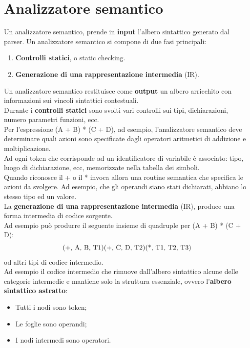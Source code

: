 \documentclass[12pt]{report}
\begin{document}
	\section{Analizzatore semantico}
	Un analizzatore semantico, prende in \textbf{input} l'albero sintattico generato dal parser. Un analizzatore semantico si compone di due fasi principali:
	\begin{enumerate}
		\item \textbf{Controlli statici}, o static checking.
		\item \textbf{Generazione di una rappresentazione intermedia} (IR).
	\end{enumerate}
	Un analizzatore semantico restituisce come \textbf{output} un albero arricchito con informazioni sui vincoli sintattici contestuali. \\
	Durante i  \textbf{controlli statici} sono svolti vari controlli sui tipi, dichiarazioni, numero parametri funzioni, ecc. \\
	Per l'espressione (A + B) * (C + D), ad esempio, l'analizzatore semantico deve determinare quali azioni sono specificate dagli operatori aritmetici di addizione e moltiplicazione. \\
	Ad ogni token che corrisponde ad un identificatore di variabile è associato: tipo, luogo di dichiarazione, ecc, memorizzate nella tabella dei simboli. \\
	Quando riconosce il + o il * invoca allora una routine semantica che specifica le azioni da svolgere. Ad esempio, che gli operandi siano stati dichiarati, abbiano lo stesso tipo ed un valore. \\
	La \textbf{generazione di una rappresentazione intermedia} (IR), produce una forma intermedia di codice sorgente. \\
	Ad esempio può produrre il seguente insieme di quadruple per (A + B) * (C + D):
	\[
	\text{(+, A, B, T1) \\ (+, C, D, T2) \\ (*, T1, T2, T3)}
	\]
	od altri tipi di codice intermedio. \\
	Ad esempio il codice intermedio che rimuove dall'albero sintattico alcune delle categorie intermedie e mantiene solo la struttura essenziale, ovvero l'\textbf{albero sintattico astratto}:
	\begin{itemize}
		\item Tutti i nodi sono token;
		\item Le foglie sono operandi;
		\item I nodi intermedi sono operatori.
	\end{itemize}
\end{document}
